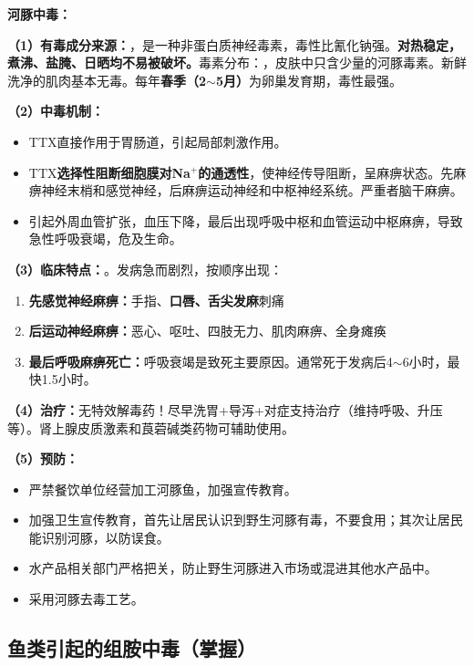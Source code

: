 \begin{keybox}
\textbf{河豚中毒：}

\textbf{（1）有毒成分来源：}，是一种非蛋白质神经毒素，毒性比氰化钠强。\textbf{对热稳定，煮沸、盐腌、日晒均不易被破坏。}毒素分布：，皮肤中只含少量的河豚毒素。新鲜洗净的肌肉基本无毒。每年\textbf{春季（2$\sim$5月）}为卵巢发育期，毒性最强。

\textbf{（2）中毒机制：}\difficulty
\begin{itemize}[leftmargin=*]
    \item TTX直接作用于胃肠道，引起局部刺激作用。
    \item TTX\textbf{选择性阻断细胞膜对Na$^+$的通透性}，使神经传导阻断，呈麻痹状态。先麻痹神经末梢和感觉神经，后麻痹运动神经和中枢神经系统。严重者脑干麻痹。
    \item 引起外周血管扩张，血压下降，最后出现呼吸中枢和血管运动中枢麻痹，导致急性呼吸衰竭，危及生命。
\end{itemize}

\textbf{（3）临床特点：}。发病急而剧烈，按顺序出现：
\begin{enumerate}[leftmargin=*]
    \item \textbf{先感觉神经麻痹：}手指、\textbf{口唇、舌尖发麻}刺痛
    \item \textbf{后运动神经麻痹：}恶心、呕吐、四肢无力、肌肉麻痹、全身瘫痪
    \item \textbf{最后呼吸麻痹死亡：}呼吸衰竭是致死主要原因。通常死于发病后4$\sim$6小时，最快1.5小时。
\end{enumerate}

\textbf{（4）治疗：}无特效解毒药！尽早洗胃+导泻+对症支持治疗（维持呼吸、升压等）。肾上腺皮质激素和莨菪碱类药物可辅助使用。

\textbf{（5）预防：}
\begin{itemize}[leftmargin=*]
    \item {}严禁餐饮单位经营加工河豚鱼，加强宣传教育。
    \item 加强卫生宣传教育，首先让居民认识到野生河豚有毒，不要食用；其次让居民能识别河豚，以防误食。
    \item 水产品相关部门严格把关，防止野生河豚进入市场或混进其他水产品中。
    \item 采用河豚去毒工艺。
\end{itemize}
\end{keybox}

\subsection{鱼类引起的组胺中毒（掌握）}

